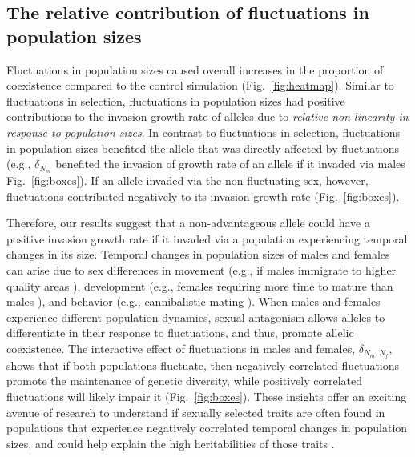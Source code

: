 \subsection*{The relative contribution of fluctuations in population sizes}

Fluctuations in population sizes caused overall increases in the proportion of coexistence compared to the control simulation  (Fig.~\ref{fig:heatmap}). Similar to fluctuations in selection, fluctuations in population sizes had positive contributions to the invasion growth rate of alleles due to \textit{relative non-linearity in response to population sizes}. In contrast to fluctuations in selection, fluctuations in population sizes benefited the allele that was directly affected by fluctuations (e.g., $\delta_{N_{m}}$ benefited the invasion of growth rate of an allele if it invaded via males Fig.~\ref{fig:boxes}). If an allele invaded via the non-fluctuating sex, however, fluctuations contributed negatively to its invasion growth rate (Fig.~\ref{fig:boxes}).

Therefore, our results suggest that a non-advantageous allele could have a positive invasion growth rate if it invaded via a population experiencing temporal changes in its size.  Temporal changes in population sizes of males and females can arise due to sex differences in movement (e.g., if males immigrate to higher quality areas \citep{matter2002experimental}), development (e.g., females requiring more time to mature than males \citep{kasumovic2008spatial}), and behavior (e.g., cannibalistic mating \citep{elgar2003male}). When males and females experience different population dynamics, sexual antagonism allows alleles to differentiate in their response to fluctuations, and thus, promote allelic coexistence. The interactive effect of fluctuations in males and females, $\delta_{N_{m},N_{f}}$, shows that if both populations fluctuate, then negatively correlated fluctuations promote the maintenance of genetic diversity, while positively correlated fluctuations will likely impair it  (Fig.~\ref{fig:boxes}). These insights offer an exciting avenue of research to understand if sexually selected traits are often found in populations that experience negatively correlated temporal changes in population sizes, and could help explain the high heritabilities of those traits \citep{reinhold2000maintenance}.



